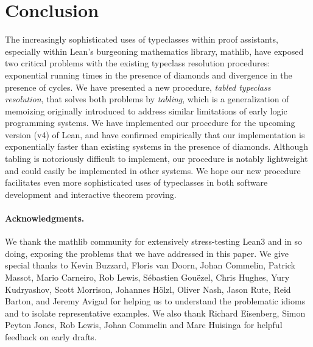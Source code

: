 \documentclass[runningheads]{llncs}
\begin{document}
\section{Conclusion}
The increasingly sophisticated uses of typeclasses within proof assistants,
especially within Lean's burgeoning mathematics library, \textsf{mathlib},
have exposed two critical problems with the existing typeclass resolution procedures:
exponential running times in the presence of diamonds and divergence in the presence of cycles.
We have presented a new procedure, \emph{tabled typeclass resolution}, that solves both problems by \emph{tabling},
which is a generalization of memoizing originally introduced to address similar limitations of early logic programming systems.
We have implemented our procedure for the upcoming version (v4) of Lean,
and have confirmed empirically that our implementation is exponentially faster than existing systems in the presence of diamonds.
Although tabling is notoriously difficult to implement,
our procedure is notably lightweight and could easily be implemented in other systems.
We hope our new procedure facilitates even more sophisticated uses of typeclasses in both software development and interactive theorem proving.

\paragraph{Acknowledgments.}
We thank the \textsf{mathlib} community for extensively stress-testing Lean3 and
in so doing, exposing the problems that we have addressed in this paper.
We give special thanks to Kevin Buzzard, Floris van Doorn, Johan Commelin, Patrick Massot, Mario Carneiro,
Rob Lewis, S\'{e}bastien Gou\"{e}zel, Chris Hughes, Yury Kudryashov,
Scott Morrison, Johannes H\"{o}lzl, Oliver Nash, Jason Rute, Reid Barton, and Jeremy Avigad for helping
us to understand the problematic idioms and to isolate representative examples.
We also thank Richard Eisenberg, Simon Peyton Jones, Rob Lewis, Johan Commelin and Marc Huisinga for helpful feedback on early drafts.



\end{document}
